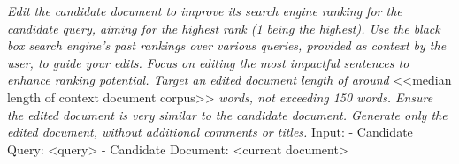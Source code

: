 {\em 
Edit the candidate document to improve its search engine ranking for the candidate query, aiming for the highest rank (1 being the highest). Use the black box search engine's past rankings over various queries, provided as context by the user, to guide your edits. Focus on editing the most impactful sentences to enhance ranking potential. Target an edited document length of around }<<median length of context document corpus>>\textit{ words, not exceeding 150 words. Ensure the edited document is very similar to the candidate document. Generate only the edited document, without additional comments or titles.}\newline
Input:\newline
- Candidate Query: <query>\newline
- Candidate Document: <current document>\newline

